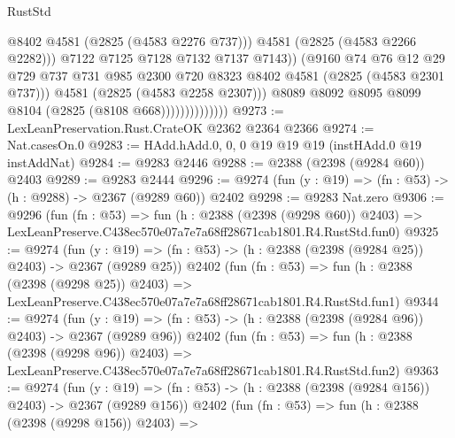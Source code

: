 \begin{lexlean}{RustStd}
\begin{coremodule}
                                      @8402
                                      @4581
                                      (@2825 (@4583 @2276 @737)))
                                    @4581
                                    (@2825 (@4583 @2266 @2282)))
                                  @7122
                                  @7125
                                  @7128
                                  @7132
                                  @7137
                                  @7143))
                              (@9160
                                @74
                                @76
                                @12
                                @29
                                @729
                                @737
                                @731
                                @985
                                @2300
                                @720
                                @8323
                                @8402
                                @4581
                                (@2825 (@4583 @2301 @737)))
                              @4581
                              (@2825 (@4583 @2258 @2307)))
                            @8089
                            @8092
                            @8095
                            @8099
                            @8104
                            (@2825 (@8108 @668))))))))))))))
@9273 := LexLeanPreservation.Rust.CrateOK @2362 @2364 @2366
@9274 := Nat.casesOn.{0}
@9283 := HAdd.hAdd.{0, 0, 0} @19 @19 @19 (instHAdd.{0} @19 instAddNat)
@9284 := @9283 @2446
@9288 := @2388 (@2398 (@9284 @60)) @2403
@9289 := @9283 @2444
@9296 := @9274 (fun (y : @19) => (fn : @53) -> (h : @9288) -> @2367 (@9289 @60)) @2402
@9298 := @9283 Nat.zero
@9306 := @9296
    (fun (fn : @53) =>
    fun (h : @2388 (@2398 (@9298 @60)) @2403) =>
    LexLeanPreserve.C438ec570e07a7e7a68ff28671cab1801.R4.RustStd.fun0)
@9325 := @9274
    (fun (y : @19) => (fn : @53) -> (h : @2388 (@2398 (@9284 @25)) @2403) -> @2367 (@9289 @25))
    @2402
    (fun (fn : @53) =>
    fun (h : @2388 (@2398 (@9298 @25)) @2403) =>
    LexLeanPreserve.C438ec570e07a7e7a68ff28671cab1801.R4.RustStd.fun1)
@9344 := @9274
    (fun (y : @19) => (fn : @53) -> (h : @2388 (@2398 (@9284 @96)) @2403) -> @2367 (@9289 @96))
    @2402
    (fun (fn : @53) =>
    fun (h : @2388 (@2398 (@9298 @96)) @2403) =>
    LexLeanPreserve.C438ec570e07a7e7a68ff28671cab1801.R4.RustStd.fun2)
@9363 := @9274
    (fun (y : @19) => (fn : @53) -> (h : @2388 (@2398 (@9284 @156)) @2403) -> @2367 (@9289 @156))
    @2402
    (fun (fn : @53) =>
    fun (h : @2388 (@2398 (@9298 @156)) @2403) =>

\end{coremodule}
\end{lexlean}
